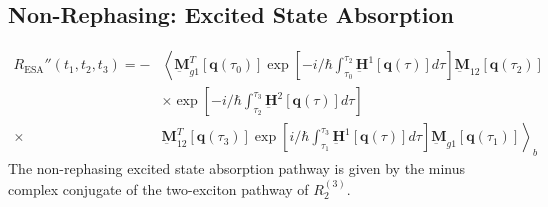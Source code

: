 \documentclass{article}
\newcommand{\bra}[1]{\ensuremath{\left\langle#1\right|}}
\newcommand{\ket}[1]{\ensuremath{\left|#1\right\rangle}}
\newcommand{\vect}[1]{\ensuremath{\boldsymbol{\mathbf{#1}}}}
\newcommand{\arw}{-{Latex[length=2mm]}}
\begin{document}
\subsection{Non-Rephasing: Excited State Absorption}
\begin{figure}[h]
\centering
{}
\end{figure}
\begin{equation}
\begin{split}
 R_\mathrm{ESA}''(t_{1},t_{2},t_{3})=-
			  &\left\langle\underbar{\vect{M}}_{g1}^{T}[\vect q(\tau_{0})]\exp\left[-i/\hbar\int_{\tau_{0}}^{\tau_{2}}\underbar{\vect{H}}^{1}[\vect q(\tau)]d\tau\right] \underbar{\vect{M}}_{12} [\vect q(\tau_{2})]\right.\\
			  &\times\exp\left[-i/\hbar\int_{\tau_{2}}^{\tau_{3}}\underbar{\vect{H}}^{2}[\vect q(\tau)]d\tau\right]\\
			  \times&\left.\underbar{\vect{M}}_{12}^{T}[\vect q(\tau_{3})]\exp\left[i/\hbar\int_{\tau_{1}}^{\tau_{3}}\underbar{\vect{H}}^{1}[\vect q(\tau)]d\tau\right] \underbar{\vect{M}}_{g1} [\vect q(\tau_{1})]\right\rangle_{b}
\end{split}
\end{equation}
The non-rephasing excited state absorption pathway is given by the minus complex conjugate of the two-exciton pathway of $R_{2}^{(3)}$.\cite{Hamm2011}
\end{document}
